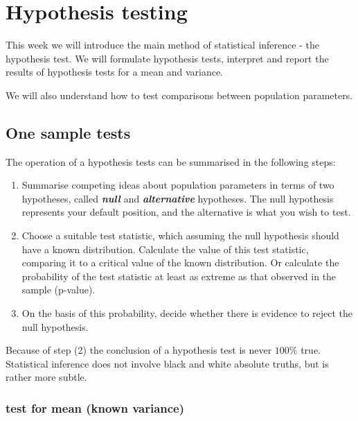\documentclass[
]{book}
\theoremstyle{definition}
\theoremstyle{definition}
\theoremstyle{definition}
\theoremstyle{definition}
\theoremstyle{remark}
\begin{document}
\hypertarget{hypothesis-testing}{%
\chapter{Hypothesis testing}\label{hypothesis-testing}}

This week we will introduce the main method of statistical inference - the hypothesis test. We will formulate hypothesis tests, interpret and report the results of hypothesis tests for a mean and variance.

We will also understand how to test comparisons between population parameters.

\hypertarget{one-sample-tests}{%
\section{One sample tests}\label{one-sample-tests}}

The operation of a hypothesis tests can be summarised in the following steps:

\begin{enumerate}
\def\labelenumi{\arabic{enumi})}
\item
  Summarise competing ideas about population parameters in terms of two hypotheses, called \textbf{\emph{null}} and \textbf{\emph{alternative}} hypotheses. The null hypothesis represents your default position, and the alternative is what you wish to test.
\item
  Choose a suitable test statistic, which assuming the null hypothesis should have a known distribution. Calculate the value of this test statistic, comparing it to a critical value of the known distribution. Or calculate the probability of the test statistic at least as extreme as that observed in the sample (p-value).
\item
  On the basis of this probability, decide whether there is evidence to reject the null hypothesis.
\end{enumerate}

Because of step (2) the conclusion of a hypothesis test is never \(100\%\) true. Statistical inference does not involve black and white absolute truths, but is rather more subtle.

\hypertarget{test-for-mean-known-variance}{%
\subsection{test for mean (known variance)}\label{test-for-mean-known-variance}}
\end{document}
